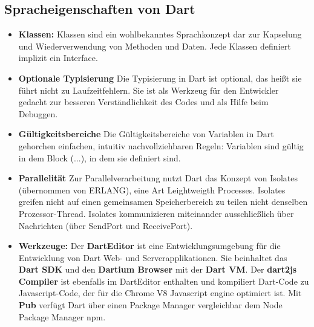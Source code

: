 \subsection{Spracheigenschaften von Dart}\label{s.Spracheigenschaften von Dart}
\begin{itemize}
\item {\bf Klassen:} 
Klassen sind ein wohlbekanntes Sprachkonzept dar zur Kapselung und Wiederverwendung von Methoden und Daten. Jede Klassen definiert implizit ein Interface.
\item {\bf Optionale Typisierung}
Die Typisierung in Dart ist optional, das heißt sie führt nicht zu Laufzeitfehlern. Sie ist als Werkzeug für den Entwickler gedacht zur besseren Verständlichkeit des Codes und als Hilfe beim Debuggen.
\item {\bf Gültigkeitsbereiche}
Die Gültigkeitsbereiche von Variablen in Dart gehorchen einfachen, intuitiv nachvollziehbaren Regeln: Variablen sind gültig in dem Block ({...}), in dem sie definiert sind.
\item {\bf Parallelität} 
Zur Parallelverarbeitung nutzt Dart das Konzept von Isolates (übernommen von ERLANG), eine Art Leightweigth Processes. Isolates greifen nicht auf einen gemeinsamen Speicherbereich zu teilen nicht denselben Prozessor-Thread. Isolates kommunizieren miteinander ausschließlich über Nachrichten (über SendPort und ReceivePort). 

\item {\bf Werkzeuge:}
Der {\bf DartEditor} ist eine Entwicklungsumgebung für die Entwicklung von Dart Web- und Serverapplikationen. Sie beinhaltet das {\bf Dart SDK } und den {\bf Dartium Browser} mit der {\bf Dart VM}.
Der {\bf dart2js Compiler} ist ebenfalls im DartEditor enthalten und kompiliert Dart-Code zu Javascript-Code, der für die Chrome V8 Javascript engine optimiert ist.
Mit {\bf Pub} verfügt Dart über einen Package Manager vergleichbar dem Node Package Manager npm.
\end{itemize}

